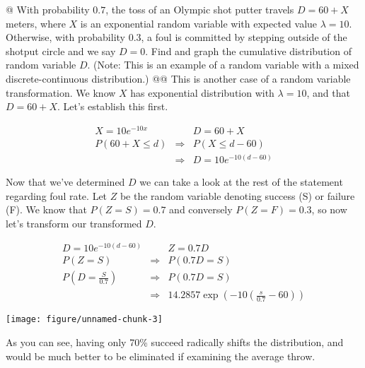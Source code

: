 \documentclass[10pt]{article}\usepackage[]{graphicx}\usepackage[]{xcolor}
\makeatletter
\def\maxwidth{ %
  \ifdim\Gin@nat@width>\linewidth
    \linewidth
  \else
    \Gin@nat@width
  \fi
}
\newenvironment{knitrout}{}{} %
\makeatother
\begin{document}
\begin{easylist}[enumerate]
    @ With probability $0.7$, the toss of an Olympic shot putter travels $D = 60 + X$ meters, where $X$ is an
    exponential random variable with expected value $\lambda = 10$. Otherwise, with probability $0.3$, a foul is
    committed by stepping outside of the shotput circle and we say $D = 0$. Find and graph the cumulative distribution
    of random variable $D$. (Note: This is an example of a random variable with a mixed discrete-continuous
    distribution.)
    @@ This is another case of a random variable transformation. We know $X$ has exponential distribution with
    $\lambda=10$, and that $D = 60 + X$. Let's establish this first.

    \[
        \begin{aligned}
            X = 10 e^{-10x} && D = 60 + X\\
            P\left( 60 + X \le d\right) &\Rightarrow& P \left( X \le d - 60 \right)\\
            &\Rightarrow& D = 10 e^{-10(d - 60)}
        \end{aligned}
    \]

    Now that we've determined $D$ we can take a look at the rest of the statement regarding foul rate. Let $Z$ be the
    random variable denoting success (S) or failure (F). We know that $P(Z=S) = 0.7$ and conversely $P(Z=F)=0.3$, so now
    let's transform our transformed $D$.

    \[
        \begin{aligned}
            D = 10 e^{-10(d - 60)} && Z = 0.7 D\\
            P(Z = S) &\Rightarrow& P(0.7D = S)\\
            P\left(D = \frac{S}{0.7} \right)  &\Rightarrow& P(0.7D = S)\\
            &\Rightarrow& 14.2857 \exp\left(-10 \left( \frac{s}{0.7} - 60 \right)\right)
        \end{aligned}
    \]

\begin{knitrout}
\color{fgcolor}

{\centering \texttt{[image: figure/unnamed-chunk-3]} 

}



\end{knitrout}


    As you can see, having only 70\% succeed radically shifts the distribution, and would be much better to be
    eliminated if examining the average throw.

\end{easylist}
\end{document}

